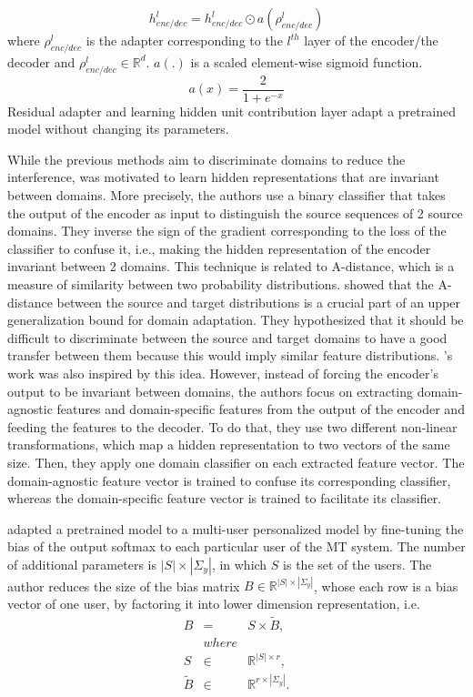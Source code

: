 \begin{equation}
h_{enc/dec}^l = h_{enc/dec}^{l} \odot a(\rho^{l}_{enc/dec})
\end{equation}
where $\rho^{l}_{enc/dec}$ is the adapter corresponding to the $l^{th}$ layer of the encoder/the decoder and $\rho^{l}_{enc/dec} \in \mathbb{R}^d$. $a(.)$ is a scaled
element-wise sigmoid function.
$$a(x) = \frac{2}{1+e^{-x}}$$
Residual adapter and learning hidden unit contribution layer adapt a pretrained model without changing its parameters. 

While the previous methods aim to discriminate domains to reduce the interference,\cite{Britz17effective} was motivated to learn hidden representations that are invariant between domains. More precisely, the authors use a binary classifier that takes the output of the encoder as input to distinguish the source sequences of 2 source domains. They inverse the sign of the gradient corresponding to the loss of the classifier to confuse it, i.e., making the hidden representation of the encoder invariant between 2 domains. This technique is related to A-distance, which is a measure of similarity between two probability distributions. \cite{Ben07analysis} showed that the A-distance between the
source and target distributions is a crucial part of an upper generalization bound for domain adaptation. They hypothesized that it should be difficult to discriminate between the source and target domains to have a good transfer between them because
this would imply similar feature distributions. \cite{Zeng18multidomain}'s work was also inspired by this idea. However, instead of forcing the encoder's output to be invariant between domains, the authors focus on extracting domain-agnostic features and domain-specific features from the output of the encoder and feeding the features to the decoder. To do that, they use two different non-linear transformations, which map a hidden representation to two vectors of the same size. Then, they apply one domain classifier on each extracted feature vector. The domain-agnostic feature vector is trained to confuse its corresponding classifier, whereas the domain-specific feature vector is trained to facilitate its classifier.

\cite{Michel18extreme} adapted a pretrained model to a multi-user personalized model by fine-tuning the
bias of the output softmax to each particular user of the MT system. The number of additional parameters is $|S| \times |\Sigma_y|$, in which $S$ is the set of the users. The author reduces the size of the bias matrix $B \in \mathbb{R}^{|S| \times |\Sigma_y|}$, whose each row is a bias vector of one user, by factoring it into lower dimension representation, i.e.
\begin{equation}
\begin{array}{rcl}
B &=& S \times \tilde{B}, \\
&where& \\
S & \in & \mathbb{R}^{|S| \times r}, \\
\tilde{B} & \in & \mathbb{R}^{r \times |\Sigma_y|}.
\end{array}
\end{equation}

